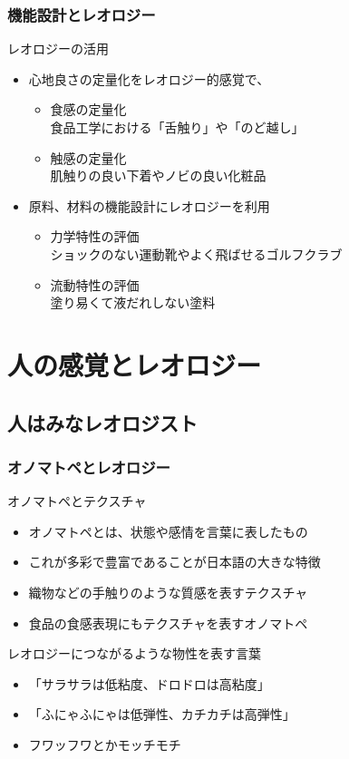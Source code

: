 \documentclass[12pt, dvipdfmx]{beamer}
\begin{document}
\begin{frame}
	\frametitle{機能設計とレオロジー}
	\begin{exampleblock}{レオロジーの活用}
		\begin{itemize}
			\item 心地良さの定量化をレオロジー的感覚で、
				\begin{itemize}
					\item 食感の定量化\\
					食品工学における「舌触り」や「のど越し」
					\item 触感の定量化\\
					肌触りの良い下着やノビの良い化粧品
				\end{itemize}
			\item 原料、材料の機能設計にレオロジーを利用
				\begin{itemize}
				\item 力学特性の評価\\
					ショックのない運動靴やよく飛ばせるゴルフクラブ
				\item 流動特性の評価\\
					塗り易くて液だれしない塗料
				\end{itemize}
		\end{itemize}
	\end{exampleblock}
\end{frame}

\section{人の感覚とレオロジー}
\subsection{人はみなレオロジスト}
\begin{frame}
	\frametitle{オノマトペとレオロジー}
	\begin{block}{オノマトペとテクスチャ}
		\begin{itemize}
			\item オノマトペとは、状態や感情を言葉に表したもの
			\item これが多彩で豊富であることが日本語の大きな特徴
			\item 織物などの手触りのような質感を表すテクスチャ
			\item 食品の食感表現にもテクスチャを表すオノマトペ
		\end{itemize}
	\end{block}
	\begin{exampleblock}{レオロジーにつながるような物性を表す言葉}
		\begin{itemize}
			\item 「サラサラは低粘度、ドロドロは高粘度」
			\item 「ふにゃふにゃは低弾性、カチカチは高弾性」
			\item フワッフワとかモッチモチ
		\end{itemize}
	\end{exampleblock}
\end{frame}
\end{document}

